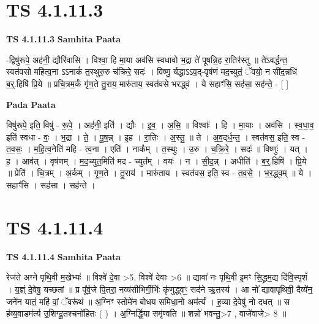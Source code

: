 \documentclass[17pt]{extarticle}
\begin{document}
\section{ TS 4.1.11.3 }

\textbf{TS 4.1.11.3 } \newline
\textbf{Samhita Paata} \newline

-द्विषु॑रूपे॒ अह॑नी॒ द्यौरि॑वासि । विश्वा॒ हि मा॒या अव॑सि स्वधावो भ॒द्रा ते॑ पूषन्नि॒ह रा॒तिर॑स्तु ॥ ते॑ऽवर्द्धन्त॒ स्वत॑वसो महित्व॒ना ऽऽनाकं॑ त॒स्थुरु॒रु च॑क्रिरे॒ सदः॑ । विष्णु॒ र्यद्धाऽऽव॒द्-वृष॑णं मद॒च्युतं॒ ॅवयो॒ न सी॑द॒न्नधि॑ ब॒र्॒.हिषि॑ प्रि॒ये ॥ प्रचि॒त्रम॒र्कं गृ॑ण॒ते तु॒राय॒ मारु॑ताय॒ स्वत॑वसे भरद्ध्वं । ये सहाꣳ॑सि॒ सह॑सा॒ सह॑न्ते॒ - [  ] \newline

\textbf{Pada Paata} \newline

विषु॑रूपे॒ इति॒ विषु॑ - रू॒पे॒ । अह॑नी॒ इति॑ । द्यौः । इ॒व॒ । अ॒सि॒ ॥ विश्वाः᳚ । हि । मा॒याः । अव॑सि । स्व॒धा॒व॒ इति॑ स्वधा - वः॒ । भ॒द्रा । ते॒ । पू॒ष॒न्न् । इ॒ह । रा॒तिः । अ॒स्तु॒ ॥ ते । अ॒व॒द्‌र्ध॒न्त॒ । स्वत॑वस॒ इति॒ स्व - त॒व॒सः॒ । म॒हि॒त्व॒नेति॑ महि - त्व॒ना । एति॑ । नाक᳚म् । त॒स्थुः । उ॒रु । च॒क्रि॒रे॒ । सदः॑ ॥ विष्णुः॑ । यत् । ह॒ । आव॑त् । वृष॑णम् । म॒द॒च्युत॒मिति॑ मद - च्युत᳚म् । वयः॑ । न । सी॒द॒न्न् । अधीति॑ । ब॒र्॒.हिषि॑ । प्रि॒ये ॥ प्रेति॑ । चि॒त्रम् । अ॒र्कम् । गृ॒ण॒ते । तु॒राय॑ । मारु॑ताय । स्वत॑वस॒ इति॒ स्व - त॒व॒से॒ । भ॒र॒द्ध्व॒म् ॥ ये । सहाꣳ॑सि । सह॑सा । सह॑न्ते ।  \newline





\section{ TS 4.1.11.4 }

\textbf{TS 4.1.11.4 } \newline
\textbf{Samhita Paata} \newline

रेज॑ते अग्ने पृथि॒वी म॒खेभ्यः॑ ॥ विश्वे॑ दे॒वा >5, विश्वे॑ देवाः >6 ॥ द्यावा॑ नः पृथि॒वी इ॒मꣳ सि॒द्ध्रम॒द्य दि॑वि॒स्पृशं᳚ । य॒ज्ञ्ं दे॒वेषु॒ यच्छतां ॥ प्र पू᳚र्व॒जे पि॒तरा॒ नव्य॑सीभिर्गी॒र्भिः कृ॑णुद्ध्वꣳ॒॒ सद॑ने ऋ॒तस्य॑ । आ नो᳚ द्यावापृथिवी॒ दैव्ये॑न॒ जने॑न यातं॒ महि॑ वां॒ ॅवरू॑थं ॥ अ॒ग्निꣳ स्तोमे॑न बोधय समिधा॒नो अम॑र्त्यं । ह॒व्या दे॒वेषु॑ नो दधत् ॥ स ह॑व्य॒वाडम॑र्त्य उ॒शिग्दू॒तश्चनो॑हितः ( ) । अ॒ग्निर्द्धि॒या समृ॑ण्वति ॥ शन्नो॑ भवन्तु॒>7 , वाजे॑वाजे> 8 ॥ \newline
\end{document}
